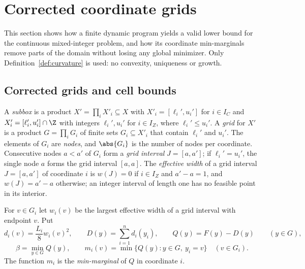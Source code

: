 \section{Corrected coordinate grids}\label{sec:grids}

This section shows how a finite dynamic program yields a valid lower bound
for the continuous mixed-integer problem, and how its coordinate
min-marginals remove parts of the domain without losing any global minimizer.
Only Definition~\ref{def:curvature} is used: no convexity, uniqueness or
growth.

\subsection{Corrected grids and cell bounds}
A \emph{subbox} is a product $X'=\prod_iX'_i\subseteq X$ with
$X'_i=[\ell_i',u_i']$ for $i\in I_C$ and $X'_i=[\ell_i',u_i']\cap\Z$ with
integers $\ell_i',u_i'$ for $i\in I_Z$, where $\ell_i'\le u_i'$. A \emph{grid} for $X'$ is a product
$G=\prod_iG_i$ of finite sets $G_i\subseteq X'_i$ that contain $\ell_i'$ and
$u_i'$. The elements of $G_i$ are \emph{nodes}, and $\abs{G_i}$ is the number
of nodes per coordinate. Consecutive nodes $a<a'$ of $G_i$ form a
\emph{grid interval} $J=[a,a']$; if $\ell_i'=u_i'$, the single node $a$ forms
the grid interval $[a,a]$. The \emph{effective width} of a grid interval
$J=[a,a']$ of coordinate $i$ is $w(J)=0$ if $i\in I_Z$ and $a'-a=1$, and
$w(J)=a'-a$ otherwise; an integer interval of length one has no feasible point
in its interior.

\begin{definition}\label{def:corr}
For $v\in G_i$ let $w_i(v)$ be the largest effective width of a grid interval
with endpoint $v$. Put
\begin{equation}\label{eq:correction}
d_i(v)=\frac{L_i}{8}w_i(v)^2,\qquad D(y)=\sum_{i=1}^nd_i(y_i),\qquad
Q(y)=F(y)-D(y)\qquad(y\in G),
\end{equation}
\begin{equation}\label{eq:minmarginal}
\beta=\min_{y\in G}Q(y),\qquad m_i(v)=\min\{Q(y):y\in G,\ y_i=v\}\quad(v\in G_i).
\end{equation}
The function $m_i$ is the \emph{min-marginal} of $Q$ in coordinate $i$.
\end{definition}

